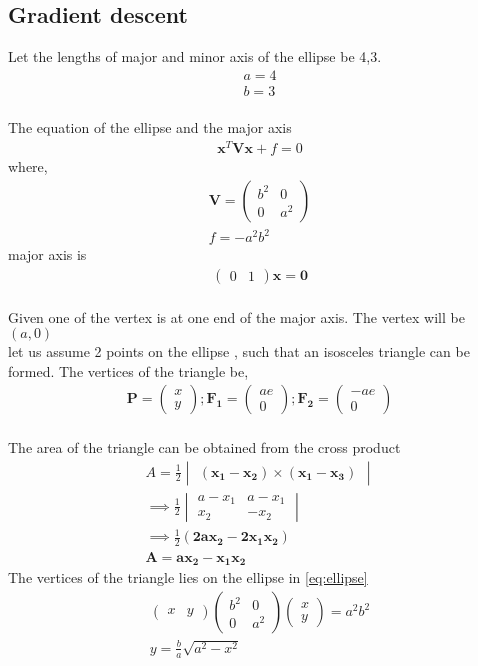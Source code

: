 \documentclass[10pt, a4paper]{article}
\newcommand{\myvec}[1]{\ensuremath{\begin{pmatrix}#1\end{pmatrix}}}
\newcommand{\mydet}[1]{\ensuremath{\begin{vmatrix}#1\end{vmatrix}}}
\providecommand{\brak}[1]{\ensuremath{\left(#1\right)}}
\let\vec\mathbf
\begin{document}
\subsection*{\normalsize Gradient descent}
Let the lengths of major and minor axis of the ellipse be 4,3.
\begin{align}
	a = 4
	\\b=3
\end{align}
\\The equation of the ellipse and the major axis 
\begin{align}
	\vec{x}^T\vec{V}\vec{x} + f = 0 
	\label{eq:ellipse}	
\end{align}
where,
\begin{align}
	\vec{V} = \myvec{b^2&0\\0&a^2}
	\\f = -a^2b^2
\end{align}
major axis is
	\begin{align}
		\myvec{0&1}\vec{x} = \vec{0}
	\end{align}
\\Given one of the vertex is at one end of the major axis. The vertex will be $(a,0)$
\\let us assume 2 points on the ellipse , such that an isosceles triangle can be formed. The vertices of the triangle be,
\begin{align}
	\vec{P} = \myvec{x \\ y} ;
	\vec{F_1} = \myvec{ae \\ 0} ;
	\vec{F_2} = \myvec{-ae \\ 0} 
\end{align}
\\The area of the triangle can be obtained from the cross product 
\begin{align}
	A = \frac{1}{2} \mydet{\vec{\brak{x_1-x_2}} \times \vec{\brak{x_1-x_3}}}
	\\ \implies \frac{1}{2} \mydet{a-x_1 & a-x_1 \\ x_2 & -x_2}
	\\ \implies \frac{1}{2} \brak{ \vec{2ax_2-2x_1x_2}}	
	\\ \vec{A} = \vec{ax_2-x_1x_2}
	\label{eq:Area}
\end{align}
The vertices of the triangle lies on the ellipse in \eqref{eq:ellipse}
\begin{align}
	\myvec{x &y} \myvec{b^2 & 0 \\ 0& a^2} \myvec{x \\y} = a^2b^2
	\\ y = \frac{b}{a}\sqrt{a^2-x^2}
	\label{eq:yval}
\end{align} 
\end{document}
